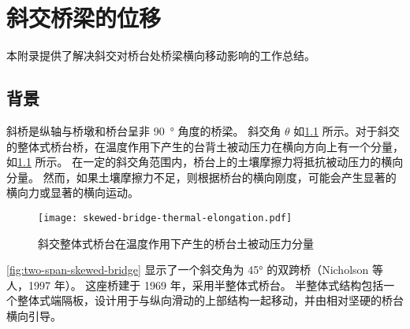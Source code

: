 \chapter{斜交桥梁的位移}
本附录提供了解决斜交对桥台处桥梁横向移动影响的工作总结。

\section{背景}
斜桥是纵轴与桥墩和桥台呈非 \qty{90}{\degree} 角度的桥梁。 斜交角 $\theta$ 如\cref{fig:skewed-bridge-thermal-elongation} 所示。对于斜交的整体式桥台桥，在温度作用下产生的台背土被动压力在横向方向上有一个分量，如\cref{fig:skewed-bridge-thermal-elongation} 所示。 在一定的斜交角范围内，桥台上的土壤摩擦力将抵抗被动压力的横向分量。 然而，如果土壤摩擦力不足，则根据桥台的横向刚度，可能会产生显著的横向力或显著的横向运动。

\begin{figure}
  \texttt{[image: skewed-bridge-thermal-elongation.pdf]}
  \caption{斜交整体式桥台在温度作用下产生的桥台土被动压力分量}
  \label{fig:skewed-bridge-thermal-elongation} 
\end{figure}

\cref{fig:two-span-skewed-bridge} 显示了一个斜交角为 \ang{45} 的双跨桥（Nicholson 等人，1997 年）。 这座桥建于 1969 年，采用半整体式桥台。 半整体式结构包括一个整体式端隔板，设计用于与纵向滑动的上部结构一起移动，并由相对坚硬的桥台横向引导。

